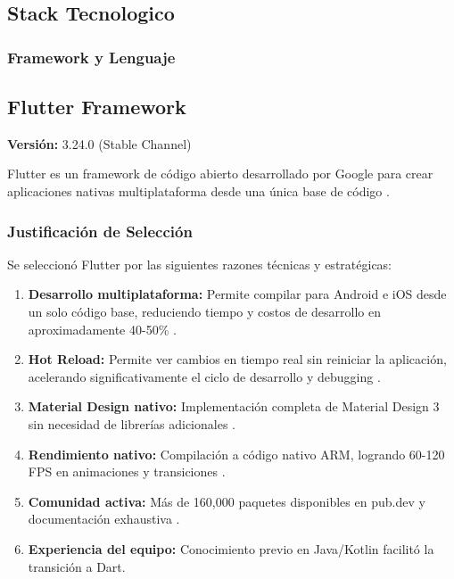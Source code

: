 \subsection{Stack Tecnologico}

\setlength{\tabcolsep}{4pt}
\setlength{\LTleft}{0pt}
\setlength{\LTright}{0pt}
\lstset{basicstyle=\ttfamily\small, breaklines=true, breakatwhitespace=true, columns=fullflexible, keepspaces=true}

\subsubsection{Framework y Lenguaje}

\subsection{Flutter Framework}

\textbf{Versión:} 3.24.0 (Stable Channel) \cite{flutter_releases}

Flutter es un framework de código abierto desarrollado por Google para crear aplicaciones nativas multiplataforma desde una única base de código \cite{flutter_docs}. 

\subsubsection{Justificación de Selección}

Se seleccionó Flutter por las siguientes razones técnicas y estratégicas:

\begin{enumerate}
    \item \textbf{Desarrollo multiplataforma:} Permite compilar para Android e iOS desde un solo código base, reduciendo tiempo y costos de desarrollo en aproximadamente 40-50\% \cite{flutter_architecture}.
    
    \item \textbf{Hot Reload:} Permite ver cambios en tiempo real sin reiniciar la aplicación, acelerando significativamente el ciclo de desarrollo y debugging \cite{flutter_hot_reload}.
    
    \item \textbf{Material Design nativo:} Implementación completa de Material Design 3 sin necesidad de librerías adicionales \cite{material_design}.
    
    \item \textbf{Rendimiento nativo:} Compilación a código nativo ARM, logrando 60-120 FPS en animaciones y transiciones \cite{flutter_performance}.
    
    \item \textbf{Comunidad activa:} Más de 160,000 paquetes disponibles en pub.dev y documentación exhaustiva \cite{pub_dev}.
    
    \item \textbf{Experiencia del equipo:} Conocimiento previo en Java/Kotlin facilitó la transición a Dart.
\end{enumerate}

